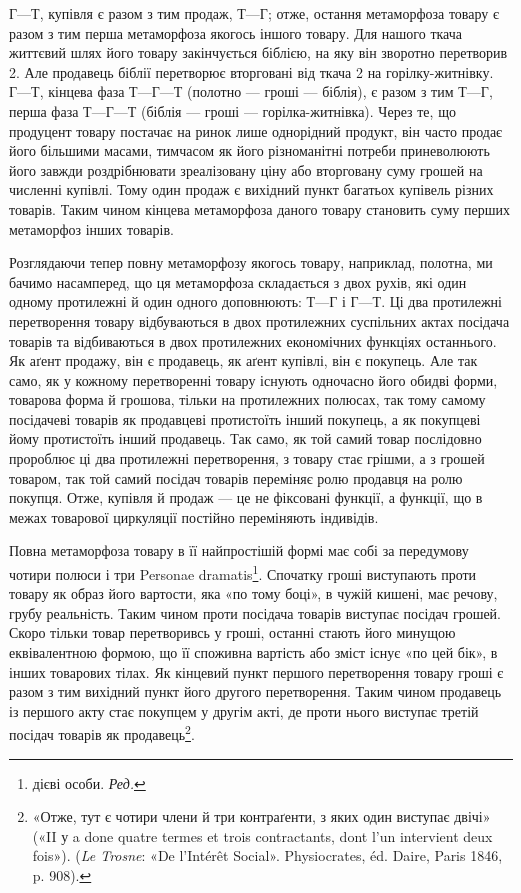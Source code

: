 
$Г — Т$, купівля є разом з тим продаж, $Т — Г$; отже, остання
метаморфоза товару є разом з тим перша метаморфоза якогось
іншого товару. Для нашого ткача життєвий шлях його товару
закінчується біблією, на яку він зворотно перетворив 2. Але продавець біблії перетворює вторговані від ткача
2 на горілку-житнівку. $Г — Т$, кінцева фаза
$Т — Г — Т$ (полотно — гроші — біблія), є разом з тим $Т — Г$,
перша фаза $Т — Г — Т$ (біблія — гроші — горілка-житнівка).
Через те, що продуцент товару постачає на ринок лише однорідний
продукт, він часто продає його більшими масами, тимчасом
як його різноманітні потреби приневолюють його завжди
роздрібнювати зреалізовану ціну або вторговану суму грошей
на численні купівлі. Тому один продаж є вихідний пункт багатьох
купівель різних товарів. Таким чином кінцева метаморфоза
даного товару становить суму перших метаморфоз інших товарів.

Розглядаючи тепер повну метаморфозу якогось товару, наприклад,
полотна, ми бачимо насамперед, що ця метаморфоза
складається з двох рухів, які один одному протилежні й один
одного доповнюють: $Т — Г$ і $Г — Т$. Ці два протилежні перетворення
товару відбуваються в двох протилежних суспільних
актах посідача товарів та відбиваються в двох протилежних
економічних функціях останнього. Як аґент продажу, він є продавець,
як аґент купівлі, він є покупець. Але так само, як у
кожному перетворенні товару існують одночасно його обидві
форми, товарова форма й грошова, тільки на протилежних полюсах,
так тому самому посідачеві товарів як продавцеві протистоїть
інший покупець, а як покупцеві йому протистоїть інший продавець.
Так само, як той самий товар послідовно пророблює ці два протилежні
перетворення, з товару стає грішми, а з грошей товаром, так
той самий посідач товарів переміняє ролю продавця на ролю покупця.
Отже, купівля й продаж — це не фіксовані функції, а функції,
що в межах товарової циркуляції постійно переміняють індивідів.

Повна метаморфоза товару в її найпростішій формі має собі
за передумову чотири полюси і три Personae dramatis\footnote*{
дієві особи. \emph{Ред.}
}. Спочатку
гроші виступають проти товару як образ його вартости, яка
«по тому боці», в чужій кишені, має речову, грубу реальність.
Таким чином проти посідача товарів виступає посідач грошей.
Скоро тільки товар перетворивсь у гроші, останні стають його
минущою еквівалентною формою, що її споживна вартість або
зміст існує «по цей бік», в інших товарових тілах. Як кінцевий
пункт першого перетворення товару гроші є разом з тим вихідний
пункт його другого перетворення. Таким чином продавець
із першого акту стає покупцем у другім акті, де проти нього
виступає третій посідач товарів як продавець\footnote{
«Отже, тут є чотири члени й три контраґенти, з яких один виступає
двічі» («II у a done quatre termes et trois contractants, dont l’un intervient
deux fois»). (\emph{Le Trosne}: «De l’Intérêt Social». Physiocrates, éd. Daire,
Paris 1846, p. 908).
}.
